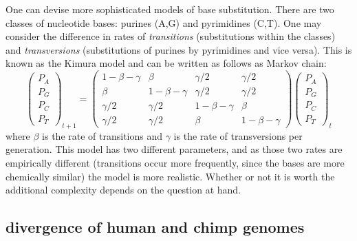 \documentclass[
  letterpaper,
  DIV=11,
  numbers=noendperiod]{scrreprt}
\begin{document}
One can devise more sophisticated models of base substitution. There are
two classes of nucleotide bases: purines (A,G) and pyrimidines (C,T).
One may consider the difference in rates of \emph{transitions}
(substitutions within the classes) and \emph{transversions}
(substitutions of purines by pyrimidines and vice versa). This is known
as the Kimura model and can be written as follows as Markov chain:
\[   \left(\begin{array}{c} P_A \\ P_G \\ P_C \\ P_T \end{array}\right)_{t+1}  = \left(\begin{array}{cccc}1-\beta-\gamma & \beta & \gamma/2 &  \gamma/2 \\ \beta  & 1-\beta-\gamma & \gamma/2 & \gamma/2 \\ \gamma/2 & \gamma/2 & 1-\beta-\gamma& \beta  \\ \gamma/2 &\gamma/2 & \beta  & 1-\beta-\gamma \end{array}\right) \left(\begin{array}{c} P_A \\ P_G \\ P_C \\ P_T \end{array}\right)_t \]
where \(\beta\) is the rate of transitions and \(\gamma\) is the rate of
transversions per generation. This model has two different parameters,
and as those two rates are empirically different (transitions occur more
frequently, since the bases are more chemically similar) the model is
more realistic. Whether or not it is worth the additional complexity
depends on the question at hand.

\hypertarget{divergence-of-human-and-chimp-genomes}{%
\subsection{divergence of human and chimp
genomes}\label{divergence-of-human-and-chimp-genomes}}
\end{document}

